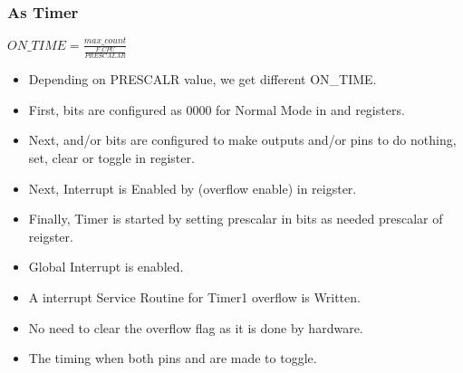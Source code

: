 \documentclass{article}
\begin{document}
\subsubsection{As Timer}
\begin{center}
    $ON\_TIME = \frac{max\_count}{\frac{F\_CPU}{PRESCALAR}}$
\end{center}
\begin{itemize}
    \item Depending on PRESCALR value, we get different ON\_TIME.
    \item First,  bits are configured as 0000 for Normal Mode in  and  registers.
    \item Next,  and/or  bits are configured to make outputs  and/or  pins to do nothing, set, clear or toggle in  register.
    \item Next, Interrupt is Enabled by  (overflow enable) in  reigster.
    \item Finally, Timer is started by setting prescalar in  bits as needed prescalar of  reigster.
    \item Global Interrupt is enabled.
    \item A interrupt Service Routine for Timer1 overflow is Written.
    \item No need to clear the overflow flag as it is done by hardware.
    \item The timing when both pins  and  are made to toggle.
\end{itemize}
\end{document}
